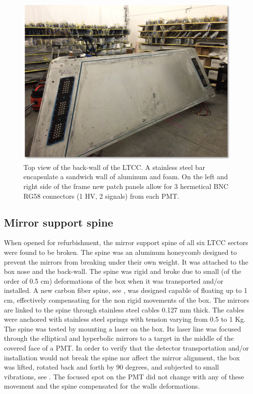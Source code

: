 \begin{figure}
	\centering
	\includegraphics[width=0.95\columnwidth,keepaspectratio]{img/backWall.png}
	\caption{Top view of the back-wall of the LTCC. A stainless steel bar encapsulate a sandwich wall of aluminum and foam. On the left and right side
            of the frame new patch panels allow for 3 hermetical BNC RG58 connectors (1 HV, 2 signals) from each PMT. }
	\label{fig:backWall}
\end{figure}


\subsection{Mirror support spine}

When opened for refurbishment, the mirror support spine of all six LTCC sectors were found to be broken. The spine was an aluminum honeycomb designed to prevent
the mirrors from breaking under their own weight. It was attached to the box nose and the back-wall. The spine was rigid and broke due to small
(of the order of 0.5 cm) deformations of the box when it was transported and/or installed.
A new carbon fiber spine, see , was designed capable of floating up to 1 cm, effectively compensating for the non rigid movements of the box.
The mirrors are linked to the spine through stainless steel cables 0.127 mm thick. The cables were anchored with stainless steel springs with tension varying from 0.5 to 1 Kg.
The spine was tested by mounting a laser on the box. Its laser line was focused through the elliptical and hyperbolic mirrors to a target in the middle of the covered face of a PMT.
In order to verify that the detector transportation and/or installation would not break the spine nor affect the mirror alignment, the box was lifted,
rotated back and forth by 90 degrees, and subjected to small vibrations, see . The focused spot on the PMT did not change with any of these movement and the spine
compensated for the walls deformations.

